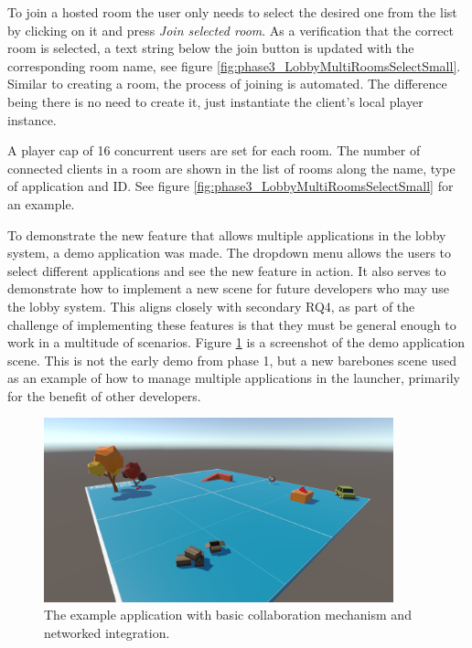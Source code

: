 To join a hosted room the user only needs to select the desired one from the list by clicking on it and press \textit{Join selected room}. As a verification that the correct room is selected, a text string below the join button is updated with the corresponding room name, see figure \ref{fig:phase3_LobbyMultiRoomsSelectSmall}. Similar to creating a room, the process of joining is automated. The difference being there is no need to create it, just instantiate the client's local player instance. 

A player cap of 16 concurrent users are set for each room. The number of connected clients in a room are shown in the list of rooms along the name, type of application and ID. See figure \ref{fig:phase3_LobbyMultiRoomsSelectSmall} for an example.  


To demonstrate the new feature that allows multiple applications in the lobby system, a demo application was made. The dropdown menu allows the users to select different applications and see the new feature in action. It also serves to demonstrate how to implement a new scene for future developers who may use the lobby system. This aligns closely with secondary RQ4, as part of the challenge of implementing these features is that they must be general enough to work in a multitude of scenarios. Figure \ref{fig:phase3_demoApp} is a screenshot of the demo application scene. This is not the early demo from phase 1, but a new barebones scene used as an example of how to manage multiple applications in the launcher, primarily for the benefit of other developers.  


\begin{figure}[H]
  \centering
   \captionsetup{width=.9\linewidth}
    \includegraphics[width=0.9\textwidth]{fig/phase_3/implementation/demoApp.PNG}
 \caption{The example application with basic collaboration mechanism and networked integration.}
\label{fig:phase3_demoApp}
\end{figure}






